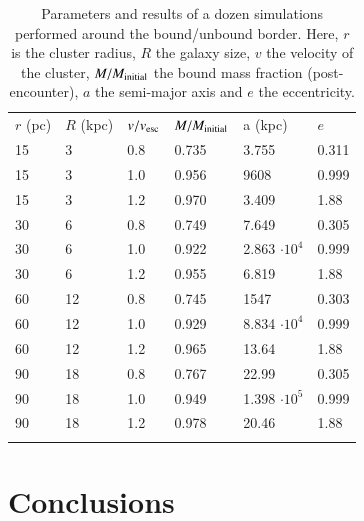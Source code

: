 \documentclass{aa}
\begin{document}
   \begin{table}
      \caption[]{Parameters and results of a dozen simulations performed around the bound/unbound border. Here, $r$ is the cluster radius, $R$ the
      		    galaxy size, $v$ the velocity of the cluster, $M/M_{\rm initial}$ the bound mass fraction (post-encounter), $a$ the semi-major axis 
		    and $e$ the eccentricity.}
         \label{tab:parameterspace}
         \begin{tabular}{llllll}
            \hline
            \noalign{\smallskip}
            $r$ (pc) & $R$ (kpc) & $v / v_{\rm esc}$ & $M/M_{\rm initial}$ & a (kpc) & $e$ \\ 
            \noalign{\smallskip}
            \hline
            \noalign{\smallskip}   
            15 & 3 & 0.8 & 0.735 & 3.755 & 0.311 \\                 
            15 & 3 & 1.0 & 0.956 & 9608 & 0.999 \\
            15 & 3 & 1.2 & 0.970 & 3.409 & 1.88 \\                 
            30 & 6 & 0.8 & 0.749 & 7.649 & 0.305 \\
            30 & 6 & 1.0 & 0.922 & 2.863 $\cdot 10^4$ & 0.999 \\                 
            30 & 6 & 1.2 & 0.955 & 6.819& 1.88 \\                 
            60 & 12 & 0.8 & 0.745 & 1547 & 0.303 \\
            60 & 12 & 1.0 & 0.929 & 8.834 $\cdot 10^4$ & 0.999 \\                 
            60 & 12 & 1.2 & 0.965 & 13.64 & 1.88  \\
            90 & 18 & 0.8 & 0.767 & 22.99 & 0.305  \\
            90 & 18 & 1.0 & 0.949 & 1.398 $\cdot 10^5$ & 0.999 \\                 
            90 & 18 & 1.2 & 0.978 & 20.46 & 1.88 \\
            \noalign{\smallskip}
            \hline
         \end{tabular}
   \end{table}
         
         
         
\section{Conclusions}
\end{document}

